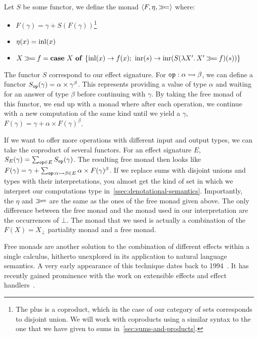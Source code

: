 Let $S$ be some functor, we define the monad
$\left<F, \eta, \mathbin{\gg\!=}\right>$ where:

\begin{itemize}
\item $F(\gamma) = \gamma + S(F(\gamma))$\footnote{The plus is a coproduct,
    which in the case of our category of sets corresponds to disjoint
    union. We will work with coproducts using a similar syntax to the one
    that we have given to sums in~\ref{sec:sums-and-products}.}
\item $\eta(x) = \operatorname{inl}(x)$
\item $X \mathbin{\gg\!=} f = \text{\textbf{case} $X$ \textbf{of} $\{ \operatorname{inl}(x) \to f(x);\ \operatorname{inr}(s) \to \operatorname{inr}(S(\lambda X'.\, X' \mathbin{\gg\!=} f)(s)) \}$}$
\end{itemize}

The functor $S$ correspond to our effect signature. For
$\mathtt{op} : \alpha \rightarrowtail \beta$, we can define a functor
$S_{\mathtt{op}}(\gamma) = \alpha \times \gamma^\beta$. This represents
providing a value of type $\alpha$ and waiting for an answer of type
$\beta$ before continuing with $\gamma$. By taking the free monad of this
functor, we end up with a monad where after each operation, we continue
with a new computation of the same kind until we yield a $\gamma$,
$F(\gamma) = \gamma + \alpha \times F(\gamma)^\beta$.

If we want to offer more operations with different input and output types,
we can take the coproduct of several functors. For an effect signature $E$,
$S_E(\gamma) = \sum_{\mathtt{op} \in E} S_{\mathtt{op}}(\gamma)$.  The resulting
free monad then looks like
$F(\gamma) = \gamma + \sum_{\mathtt{op} : \alpha \rightarrowtail \beta \in E} \alpha
\times F(\gamma)^\beta$. If we replace sums with disjoint unions and types
with their interpretations, you almost get the kind of set in which we
interpret our computations type
in~\ref{ssec:denotational-semantics}. Importantly, the $\eta$ and $\mathbin{\gg\!=}$
are the same as the ones of the free monad given above. The only difference
between the free monad and the monad used in our interpretation are the
occurrences of $\bot$. The monad that we used is actually a combination of
the $F(X) = X_\bot$ partiality monad and a free monad.

Free monads are another solution to the combination of different effects
within a single calculus, hitherto unexplored in its application to natural
language semantics. A very early appearance of this technique dates back to
1994~\cite{cartwright1994extensible}. It has recently gained prominence
with the work on extensible effects and effect
handlers~\cite{kiselyov2013extensible,bauer2012programming,kammar2013handlers,brady2013programming,plotkin2013handling,pretnar2010logic}.


